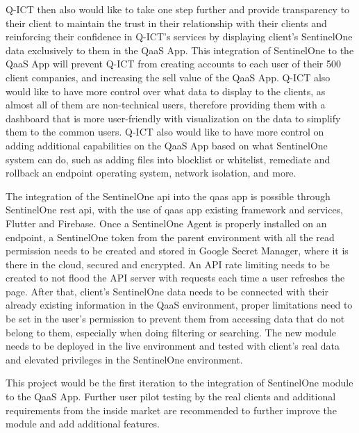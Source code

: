 Q-ICT then also would like to take one step further and provide transparency to their client to maintain the trust in their relationship with
their clients and reinforcing their confidence in Q-ICT's services by displaying client's SentinelOne data exclusively to them in the QaaS App.
This integration of SentinelOne to the QaaS App will prevent Q-ICT from creating accounts to each user of their 500 client companies, and
increasing the sell value of the QaaS App. Q-ICT also would like to have more control over what data to display to the clients, as almost all
of them are non-technical users, therefore providing them with a dashboard that is more user-friendly with visualization on the data to
simplify them to the common users. Q-ICT also would like to have more control on adding additional capabilities on the QaaS App based on
what SentinelOne system can do, such as adding files into blocklist or whitelist, remediate and rollback an endpoint operating system,
network isolation, and more.

The integration of the SentinelOne \acrshort{api} into the \acrshort{qaas} app is possible through SentinelOne \acrshort{rest} \acrshort{api},
with the use of \acrshort{qaas} app existing framework and services, Flutter and Firebase. Once a SentinelOne Agent is properly installed on an
endpoint, a SentinelOne token from the parent environment with all the read permission needs to be created and stored in Google Secret Manager,
where it is there in the cloud, secured and encrypted. An API rate limiting needs to be created to not flood the API server with requests each
time a user refreshes the page. After that, client's SentinelOne data needs to be connected with their already existing  information in the
QaaS environment, proper limitations need to be set in the user's permission to prevent them from accessing data that do not belong to them,
especially when doing filtering or searching. The new module needs to be deployed in the live environment and tested with client's real data
and elevated privileges in the SentinelOne environment.

This project would be the first iteration to the integration of SentinelOne module to the QaaS App. Further user pilot testing by the real
clients and additional requirements from the inside market are recommended to further improve the module and add additional features.


